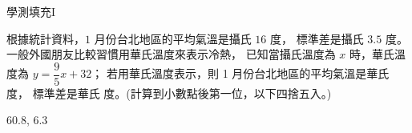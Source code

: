     \begin{QUESTION}
        \begin{ExamInfo}{92}{學測}{填充}{I}
        \end{ExamInfo}
        \begin{ExamAnsRateInfo}{38}{70}{35}{9}
        \end{ExamAnsRateInfo}
        \begin{QBODY}
            根據統計資料，$1$ 月份台北地區的平均氣溫是攝氏 $16$ 度，
            標準差是攝氏 $3.5$ 度。一般外國朋友比較習慣用華氏溫度來表示冷熱，
            已知當攝氏溫度為 $x$ 時，華氏溫度為 $y =\dfrac{9}{5}x + 32$；
            若用華氏溫度表示，則 1 月份台北地區的平均氣溫是華氏 
             度，
            標準差是華氏 
             度。(計算到小數點後第一位，以下四捨五入。)
        \end{QBODY}
        \begin{QFROMS}
        \end{QFROMS}
        \begin{QTAGS}\end{QTAGS}
        \begin{QANS}
            $60.8$, $6.3$
        \end{QANS}
        \begin{QSOLLIST}
        \end{QSOLLIST}
        \begin{QEMPTYSPACE}
        \end{QEMPTYSPACE}
    \end{QUESTION}

